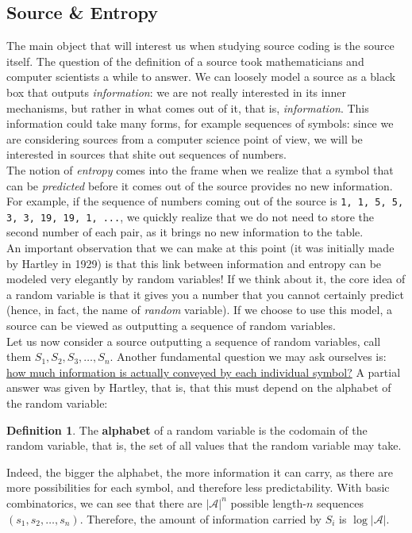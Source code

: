 \documentclass{report}
\theoremstyle{plain}
\theoremstyle{definition}
\newtheorem{defn}[thm]{Definition}
\theoremstyle{remark}
\begin{document}
\subsection{Source \& Entropy}
The main object that will interest us when studying source coding is the source itself. The question of the definition of a source took mathematicians and computer scientists a while to answer. We can loosely model a source as a black box that outputs \emph{information}: we are not really interested in its inner mechanisms, but rather in what comes out of it, that is, \emph{information}. This information could take many forms, for example sequences of symbols: since we are considering sources from a computer science point of view, we will be interested in sources that shite out sequences of numbers. \\
 The notion of \emph{entropy} comes into the frame when we realize that a symbol that can be \emph{predicted} before it comes out of the source provides no new information. For example, if the sequence of numbers coming out of the source is \texttt{1, 1, 5, 5, 3, 3, 19, 19, 1, ...}, we quickly realize that we do not need to store the second number of each pair, as it brings no new information to the table. \\
 An important observation that we can make at this point (it was initially made by Hartley in 1929) is that this link between information and entropy can be modeled very elegantly by random variables! If we think about it, the core idea of a random variable is that it gives you a number that you cannot certainly predict (hence, in fact, the name of \emph{random} variable). If we choose to use this model, a source can be viewed as outputting a sequence of random variables. \\
Let us now consider a source outputting a sequence of random variables, call them $S_1, S_2, S_3, \dots, S_n$. Another fundamental question we may ask ourselves is: \ul{how much information is actually conveyed by each individual symbol?} A partial answer was given by Hartley, that is, that this must depend on the alphabet of the random variable: 
\begin{defn}
	The \textbf{alphabet} of a random variable is the codomain of the random variable, that is, the set of all values that the random variable may take.
\end{defn}
Indeed, the bigger the alphabet, the more information it can carry, as there are more possibilities for each symbol, and therefore less predictability. With basic combinatorics, we can see that there are $|\mathcal A|^n$ possible length-$n$ sequences $(s_1, s_2, \dots, s_n)$. Therefore, the amount of information carried by $S_i$ is $\log|\mathcal A|$. 
\end{document}
